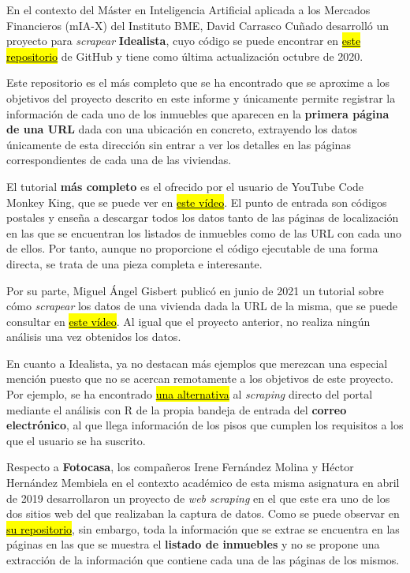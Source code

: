 \documentclass[12pt]{article}
\begin{document}
En el contexto del Máster en Inteligencia Artificial aplicada a los Mercados Financieros (mIA-X) del Instituto BME, David Carrasco Cuñado desarrolló un proyecto para \textit{scrapear} \textbf{Idealista}, cuyo código se puede encontrar en \href{https://github.com/David-Carrasco/Scrapy-Idealista}{\hl{este repositorio}} de GitHub y tiene como última actualización octubre de 2020. 

Este repositorio es el más completo que se ha encontrado que se aproxime a los objetivos del proyecto descrito en este informe y únicamente permite registrar la información de cada uno de los inmuebles que aparecen en la \textbf{primera página de una URL} dada con una ubicación en concreto, extrayendo los datos únicamente de esta dirección sin entrar a ver los detalles en las páginas correspondientes de cada una de las viviendas. 

El tutorial \textbf{más completo} es el ofrecido por el usuario de YouTube Code Monkey King, que se puede ver en \href{https://www.youtube.com/watch?v=4Tv73KuqgVo}{\hl{este vídeo}}. El punto de entrada son códigos postales y enseña a descargar todos los datos tanto de las páginas de localización en las que se encuentran los listados de inmuebles como de las URL con cada uno de ellos. Por tanto, aunque no proporcione el código ejecutable de una forma directa, se trata de una pieza completa e interesante. 

Por su parte, Miguel Ángel Gisbert publicó en junio de 2021 un tutorial sobre cómo \textit{scrapear} los datos de una vivienda dada la URL de la misma, que se puede consultar en \href{https://www.youtube.com/watch?v=2UyJv5oe570}{\hl{este vídeo}}. Al igual que el proyecto anterior, no realiza ningún análisis una vez obtenidos los datos. 

En cuanto a Idealista, ya no destacan más ejemplos que merezcan una especial mención puesto que no se acercan remotamente a los objetivos de este proyecto. Por ejemplo, se ha encontrado \href{https://medium.com/@rubenmarcos/crear-una-base-de-datos-de-la-evoluci%C3%B3n-del-mercado-inmobiliario-con-idealista-y-r-y-sin-scraping-1d5025a9d47e}{\hl{una alternativa}} al \textit{scraping} directo del portal mediante el análisis con R de la propia bandeja de entrada del \textbf{correo electrónico}, al que llega información de los pisos que cumplen los requisitos a los que el usuario se ha suscrito.

Respecto a \textbf{Fotocasa}, los compañeros Irene Fernández Molina y Héctor Hernández Membiela en el contexto académico de esta misma asignatura en abril de 2019 desarrollaron un proyecto de \textit{web scraping} en el que este era uno de los dos sitios web del que realizaban la captura de datos. Como se puede observar en \href{https://github.com/EdelBlau/PEC_TPC}{\hl{su repositorio}}, sin embargo, toda la información que se extrae se encuentra en las páginas en las que se muestra el \textbf{listado de inmuebles} y no se propone una extracción de la información que contiene cada una de las páginas de los mismos. 
\end{document}
